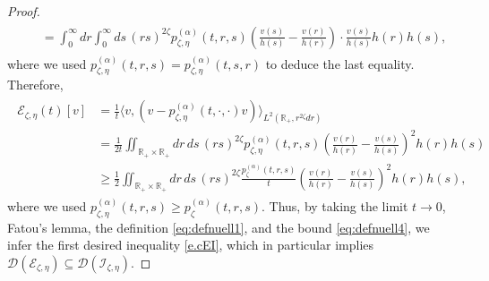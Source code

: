 \documentclass[12pt,reqno]{amsart}
\theoremstyle{definition}
\theoremstyle{remark}
\numberwithin{equation}{section}
\newcommand{\1}{\mathbbm{1}}
\newcommand{\D}{\mathcal{D}}
\newcommand{\R}{\mathbb{R}}
\def\ce{\mathcal{E}}
\def\ci{\mathcal{I}}
\begin{document}
\begin{proof}
\begin{align}
\begin{split}
      & \quad = \int_0^\infty dr\int_0^\infty ds\, (rs)^{2\zeta} p_{\zeta,\eta}^{(\alpha)}(t,r,s)\left(\frac{v(s)}{h(s)}-\frac{v(r)}{h(r)}\right)\cdot\frac{v(s)}{h(s)}h(r)h(s),
    \end{split}
  \end{align}
  where we used $p_{\zeta,\eta}^{(\alpha)}(t,r,s)=p_{\zeta,\eta}^{(\alpha)}(t,s,r)$ to deduce the last equality. Therefore,
  \begin{align}
    \begin{split}
      \ce_{\zeta,\eta}(t)[v]
      & = \frac1t\langle v,(v- p_{\zeta,\eta}^{(\alpha)}(t,\cdot,\cdot)v)\rangle_{L^2(\R_+,r^{2\zeta}dr)} \\
      & = \frac{1}{2t}\iint_{\R_+\times\R_+} dr\,ds\, (rs)^{2\zeta} p_{\zeta,\eta}^{(\alpha)}(t,r,s)\left(\frac{v(r)}{h(r)}-\frac{v(s)}{h(s)}\right)^2 h(r)h(s) \\
      & \geq \frac12\iint_{\R_+\times\R_+} dr\,ds\, (rs)^{2\zeta} \frac{p_\zeta^{(\alpha)}(t,r,s)}{t} \left(\frac{v(r)}{h(r)}-\frac{v(s)}{h(s)}\right)^2 h(r)h(s),
    \end{split}
  \end{align}
  where we used $p_{\zeta,\eta}^{(\alpha)}(t,r,s)\geq p_\zeta^{(\alpha)}(t,r,s)$.
  Thus, by taking the limit $t\to0$, Fatou's lemma, the definition \eqref{eq:defnuell1}, and the bound \eqref{eq:defnuell4}, we infer the first desired inequality \eqref{e.cEI},
  which in particular implies $\D(\ce_{\zeta,\eta})\subseteq\D(\ci_{\zeta,\eta})$.


\end{proof}
\end{document}
